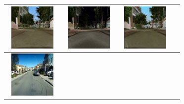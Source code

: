 \documentclass{VUMIFPSbakalaurinis}
\begin{document}
\begin{table}[H]
{\begin{tabular}{|c|c|c|c|}
            \includegraphics[width=100,height=85]{img/pvz/1_cycle_v2} & \includegraphics[width=100,height=85]{img/pvz/1_cut_v2} & \includegraphics[width=100,height=85]{img/pvz/1_mspc_v2}
            \\
            \hline
            \includegraphics[width=100,height=85]{img/pvz/3_real} & 

\end{tabular}}
\end{table}
\end{document}
